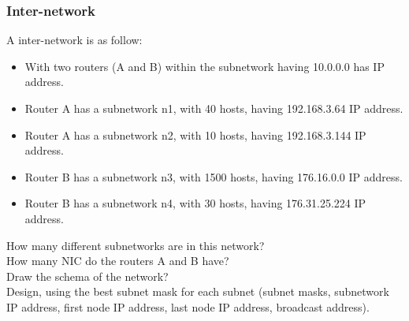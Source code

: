 \documentclass[11pt]{article}
\begin{document}
\subsubsection{Inter-network}
A inter-network is as follow:
\begin{itemize}
  \item With two routers (A and B) within the subnetwork having 10.0.0.0 has IP address.
  \item Router A has a subnetwork n1, with 40 hosts, having 192.168.3.64 IP address.
  \item Router A has a subnetwork n2, with 10 hosts, having 192.168.3.144 IP address.
  \item Router B has a subnetwork n3, with 1500 hosts, having 176.16.0.0 IP address.
  \item Router B has a subnetwork n4, with 30 hosts, having 176.31.25.224 IP address.
\end{itemize}

How many different subnetworks are in this network?\\
How many NIC do the routers A and B have?\\
Draw the schema of the network?\\
Design, using the best subnet mask for each subnet (subnet masks, subnetwork IP address, first node IP address, last node IP address, broadcast address).
\end{document}
